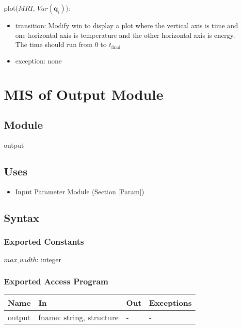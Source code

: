 \documentclass[12pt, titlepage]{article}
\begin{document}
\noindent plot($MRI$, $Var(\mathbf q_i)$):
\begin{itemize}
\item transition: Modify win to display a plot where the vertical axis
  is time and one horizontal axis is temperature and the other
  horizontal axis is energy.  The time should run from $0$ to $t_\text{final}$
\item exception: none
\end{itemize}

\newpage

\section{MIS of Output Module} \label{Output}

\subsection{Module}

output

\subsection{Uses}

\begin{itemize}
\item Input Parameter Module (Section \ref{Param})
\end{itemize}

\subsection{Syntax}

\subsubsection{Exported Constants}

$max\_width$: integer

\subsubsection{Exported Access Program}

\begin{center}
\begin{tabular}{p{3cm} p{7cm} p{2cm} p{2cm}}
\hline
\textbf{Name} & \textbf{In} & \textbf{Out} & \textbf{Exceptions} \\
\hline
output & fname: string,  structure & - & - \\
\hline
\end{tabular}
\end{center}
\end{document}
